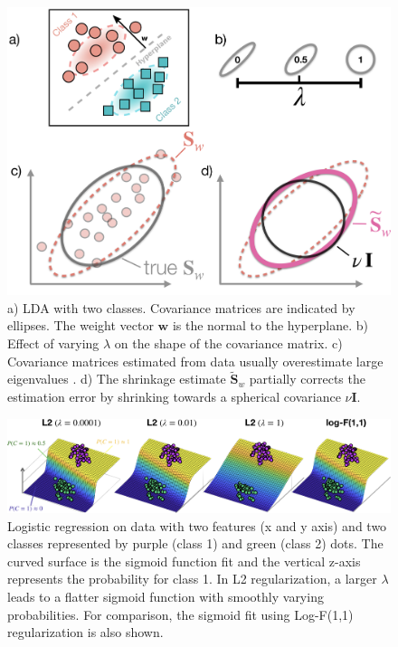 \documentclass[utf8]{frontiersSCNS} %
\newcommand{\w}{\mathbf{w}}
\renewcommand{\S}{\mathbf{S}}
\begin{document}
\begin{figure}[ht!]
\centering\includegraphics[width=\linewidth]{figures/LDA_regularization}
\caption{a) LDA with two classes. Covariance matrices are indicated by ellipses. The weight vector $\w$ is the normal to the hyperplane. b) Effect of varying $\lambda$ on the shape of the covariance matrix. c) Covariance matrices estimated from data usually overestimate large eigenvalues \citep{Blankertz2011}. d) The shrinkage estimate $\widetilde{\S}_w$ partially corrects the estimation error by shrinking towards a spherical covariance $\nu\mathbf{I}$.}\label{fig:lda}
\end{figure}

\begin{figure}[ht!]
\centering\includegraphics[width=\linewidth]{figures/logreg_regularization}
\caption{Logistic regression on data with two features (x and y axis) and two classes represented by purple (class 1) and green (class 2) dots. The curved surface is the sigmoid function fit and the vertical z-axis represents the probability for class 1. In L2 regularization, a larger $\lambda$ leads to a flatter sigmoid function with smoothly varying probabilities. For comparison, the sigmoid fit using Log-F(1,1) regularization is also shown.}\label{fig:logreg}
\end{figure}
\end{document}
